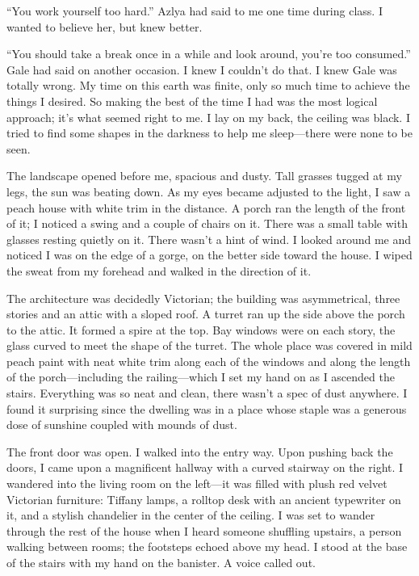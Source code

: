 ``You work yourself too hard.'' Azlya had said to me one time during
class. I wanted to believe her, but knew better.

``You should take a break once in a while and look around, you're too
consumed.'' Gale had said on another occasion. I knew I couldn't do
that. I knew Gale was totally wrong. My time on this earth was finite,
only so much time to achieve the things I desired. So making the best of
the time I had was the most logical approach; it's what seemed right to
me. I lay on my back, the ceiling was black. I tried to find some shapes
in the darkness to help me sleep---there were none to be seen.

The landscape opened before me, spacious and dusty. Tall grasses tugged
at my legs, the sun was beating down. As my eyes became adjusted to the
light, I saw a peach house with white trim in the distance. A porch ran
the length of the front of it; I noticed a swing and a couple of chairs
on it. There was a small table with glasses resting quietly on it. There
wasn't a hint of wind. I looked around me and noticed I was on the edge
of a gorge, on the better side toward the house. I wiped the sweat from
my forehead and walked in the direction of it.

The architecture was decidedly Victorian; the building was asymmetrical,
three stories and an attic with a sloped roof. A turret ran up the side
above the porch to the attic. It formed a spire at the top. Bay windows
were on each story, the glass curved to meet the shape of the turret.
The whole place was covered in mild peach paint with neat white trim
along each of the windows and along the length of the porch---including
the railing---which I set my hand on as I ascended the stairs.
Everything was so neat and clean, there wasn't a spec of dust anywhere.
I found it surprising since the dwelling was in a place whose staple was
a generous dose of sunshine coupled with mounds of dust.

The front door was open. I walked into the entry way. Upon pushing back
the doors, I came upon a magnificent hallway with a curved stairway on
the right. I wandered into the living room on the left---it was filled
with plush red velvet Victorian furniture: Tiffany lamps, a rolltop desk
with an ancient typewriter on it, and a stylish chandelier in the center
of the ceiling. I was set to wander through the rest of the house when I
heard someone shuffling upstairs, a person walking between rooms; the
footsteps echoed above my head. I stood at the base of the stairs with
my hand on the banister. A voice called out.

